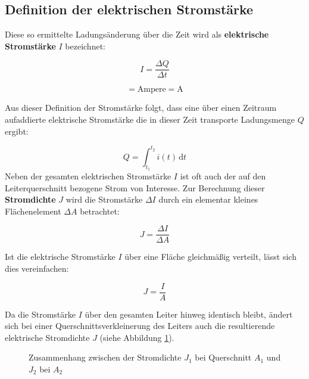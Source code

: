 {\subsection{Definition der elektrischen Stromstärke}

Diese so ermittelte Ladungsänderung über die Zeit wird als \textbf{elektrische Stromstärke} $I$ bezeichnet:

\begin{equation}
	I = \frac{\Delta Q}{\Delta t}
	\label{eq:stromdef}
\end{equation}



\begin{equation*}
	[I] = \mathrm{Ampere} = \mathrm{A}
\end{equation*}


Aus dieser Definition der Stromstärke folgt, dass eine über einen Zeitraum aufaddierte elektrische 
Stromstärke die in dieser Zeit transporte Ladungsmenge $Q$ ergibt:

\begin{equation}
	Q = \int_{t_1}^{t_2} i(t) \, \mathrm{d} t	
\end{equation}
Neben der gesamten elektrischen Stromstärke $I$ ist oft auch der auf den Leiterquerschnitt bezogene Strom von Interesse.
Zur Berechnung dieser \textbf{Stromdichte} $J$ wird die Stromstärke $\Delta I$ durch ein elementar kleines Flächenelement $\Delta A$
betrachtet: 

\begin{equation}
	J = \frac{\Delta I}{\Delta A}
\end{equation}

Ist die elektrische Stromstärke $I$ über eine Fläche gleichmäßig verteilt, lässt sich dies vereinfachen:

\begin{equation}
	J = \frac{I}{A}
\end{equation}

Da die Stromstärke $I$ über den gesamten Leiter hinweg identisch bleibt, ändert sich bei einer 
Querschnittsverkleinerung des Leiters auch die resultierende elektrische Stromdichte $J$ (siehe Abbildung \ref{fig:stromdichte}).

\begin{figure}[ht]
	\centering
	\caption{Zusammenhang zwischen der Stromdichte $J_1$ bei Querschnitt $A_1$ und $J_2$ bei $A_2$}
	\label{fig:stromdichte}
\end{figure}

}

